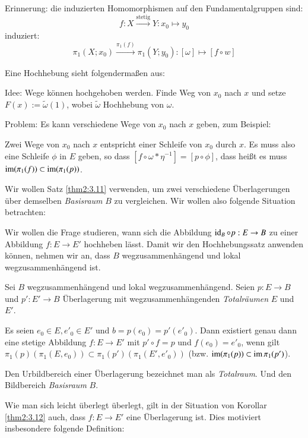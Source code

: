 \documentclass[a4paper,10pt]{scrartcl}
\begin{document}
\begin{note*}
Erinnerung: die induzierten Homomorphismen auf den Fundamentalgruppen sind:
\[
 f: X\stackrel{\text{stetig}}{\longrightarrow} Y: x_0\mapsto y_0
\]
induziert:
\[
 \pi_1(X;x_0) \stackrel{\pi_1(f)}{\longrightarrow} \pi_1(Y;y_0): [\omega] \mapsto [f\circ w]
\]
\begin{figure}[H]
\centering
 \fixme[fig86]
\caption{}
\end{figure}
Eine Hochhebung sieht folgendermaßen aus:
\begin{figure}[H]
\centering
 \fixme[fig87]
\caption{}
\end{figure}
\begin{seg}{Idee:}
 Wege können hochgehoben werden. Finde Weg von $x_0$ nach $x$ und setze $F(x):=\tilde \omega(1)$, wobei $\tilde \omega$ Hochhebung von $\omega$.
\end{seg}

\begin{seg}{Problem:}
 Es kann verschiedene Wege von $x_0$ nach $x$ geben, zum Beispiel:\\
\begin{figure}[H]
\centering
 \fixme[fig88]
\caption{}
\end{figure}
Zwei Wege von $x_0$ nach $x$ entspricht einer Schleife von $x_0$ durch $x$. Es muss also eine Schleife $\phi$ in $E$ geben, so dass $[f\circ \omega*\eta^{-1}]=[p\circ \phi]$, dass heißt es muss $\operatorname{im}(\pi_1(f))\subset \operatorname{im}(\pi_1(p))$.
\begin{figure}[H]
\centering
 \fixme[fig89]
\caption{}
\end{figure}
\end{seg}
\end{note*}
Wir wollen Satz \ref{thm2:3.11} verwenden, um zwei verschiedene Überlagerungen über demselben \emph{Basisraum} $B$ zu vergleichen. Wir wollen also folgende Situation betrachten:
\begin{figure}[H]
\centering
 
\caption{}
\end{figure}
Wir wollen die Frage studieren, wann sich die Abbildung $\operatorname{id}_B\circ p:E\to B$ zu einer Abbildung $f:E \to E'$ hochheben lässt. Damit wir den Hochhebungssatz anwenden können, nehmen wir an, dass $B$ wegzusammenhängend und lokal wegzusammenhängend ist. 
\begin{kor}\label{thm2:3.12}
 Sei $B$ wegzusammenhängend und lokal wegzusammenhängend. Seien $p:E\to B$ und $p':E'\to B$ Überlagerung mit wegzusammenhängenden \emph{Totalräumen} $E$ und $E'$.

Es seien $e_0\in E, e'_0\in E'$ und $b=p(e_0)=p'(e'_0)$. Dann existiert genau dann eine stetige Abbildung $f:E\to E'$ mit $p'\circ f=p$ und $f(e_0)=e'_0$, wenn gilt $\pi_1(p)(\pi_1(E,e_0))\subset \pi_1(p')(\pi_1(E', e'_0))$ (bzw. $\operatorname{im}(\pi_1(p))\subset \operatorname{im} \pi_1(p')$).
\end{kor}
\begin{note*}
 Den Urbildbereich einer Überlagerung bezeichnet man als \emph{Totalraum}. Und den Bildbereich \emph{Basisraum} $B$. 
\end{note*}
Wie man sich leicht überlegt überlegt, gilt in der Situation von Korollar \ref{thm2:3.12} auch, dass $f:E\to E'$ eine Überlagerung ist. Dies motiviert insbesondere folgende Definition:
\end{document}
